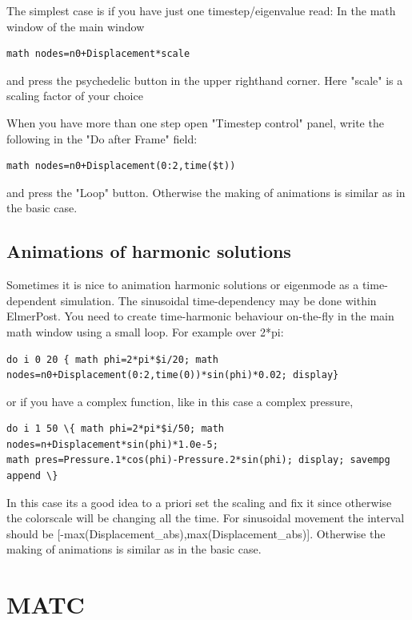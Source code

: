 The simplest case is if you have just one timestep/eigenvalue read: In the math window of the main window

\begin{verbatim}
math nodes=n0+Displacement*scale
\end{verbatim}

and press the psychedelic button in the upper righthand corner. Here "scale" is a scaling factor of your choice

When you have more than one step open "Timestep control" panel, write the following in the "Do after Frame" field:

\begin{verbatim}
math nodes=n0+Displacement(0:2,time($t))
\end{verbatim}

and press the "Loop" button. Otherwise the making of animations is similar as in the basic case.

\subsection{Animations of harmonic solutions}

Sometimes it is nice to animation harmonic solutions or eigenmode as a time-dependent simulation. The sinusoidal time-dependency may be done within ElmerPost. You need to create time-harmonic behaviour on-the-fly in the main math window using a small loop. For example over 2*pi:

\begin{verbatim}
do i 0 20 { math phi=2*pi*$i/20; math 
nodes=n0+Displacement(0:2,time(0))*sin(phi)*0.02; display}
\end{verbatim}

or if you have a complex function, like in this case a complex pressure,

\begin{verbatim}
do i 1 50 \{ math phi=2*pi*$i/50; math nodes=n+Displacement*sin(phi)*1.0e-5; 
math pres=Pressure.1*cos(phi)-Pressure.2*sin(phi); display; savempg append \}
\end{verbatim}

In this case its a good idea to a priori set the scaling and fix it since otherwise the colorscale will be changing all the time. For sinusoidal movement the interval should be [-max(Displacement\_abs),max(Displacement\_abs)]. Otherwise the making of animations is similar as in the basic case.


\section{MATC}

